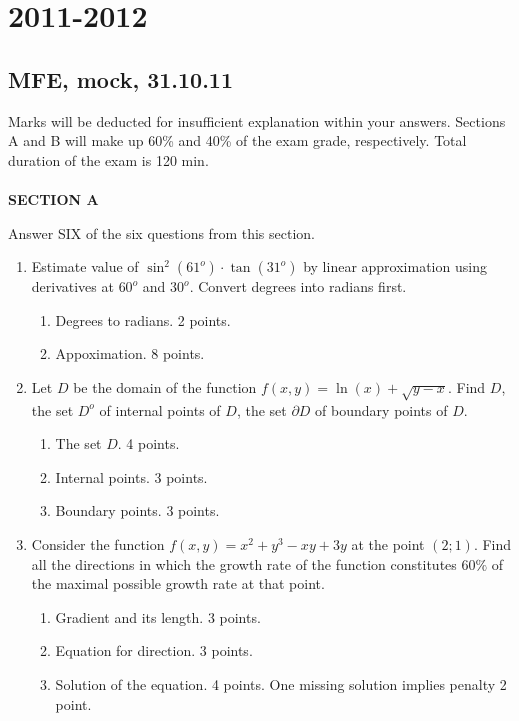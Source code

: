 \documentclass[12pt]{article} %
\theoremstyle{definition} %
\begin{document}
\section{2011-2012}

\subsection{MFE, mock, 31.10.11}
Marks will be deducted for insufficient explanation within your answers. Sections A and B will make up 60\% and 40\% of the exam grade, respectively. Total duration of the exam is 120 min. \\ \\
\textbf{SECTION A}

Answer SIX of the six questions from this section.

\begin{enumerate}

\item Estimate value of $\sin^2(61^{o})\cdot\tan(31^{o})$ by linear approximation using derivatives at $60^{o}$ and $30^{o}$. Convert degrees into radians first.

\begin{enumerate}
\item Degrees to radians. 2 points.
\item Appoximation. 8 points.
\end{enumerate}


\item Let $D$ be the domain of the function $f(x,y)=\ln(x)+\sqrt{y-x}$. Find $D$, the set $D^{o}$ of internal points of $D$, the set $\partial D$ of boundary points of $D$.

\begin{enumerate}
\item The set $D$. 4 points.
\item Internal points. 3 points.
\item Boundary points. 3 points.
\end{enumerate}


\item Consider the function $f(x,y)=x^2+y^3-xy+3y$ at the point $(2;1)$. Find all the directions in which the  growth rate of the function constitutes $60\%$ of the maximal possible growth rate at that point.

\begin{enumerate}
\item Gradient and its length. 3 points.
\item Equation for direction. 3 points.
\item Solution of the equation. 4 points. One missing solution implies penalty 2 point.
\end{enumerate}




\end{enumerate}
\end{document}
